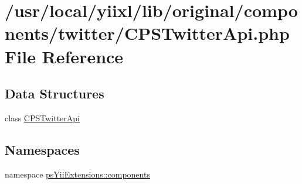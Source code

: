 \hypertarget{CPSTwitterApi_8php}{
\section{/usr/local/yiixl/lib/original/components/twitter/CPSTwitterApi.php File Reference}
\label{CPSTwitterApi_8php}
}
\subsection*{Data Structures}
\begin{DoxyCompactItemize}
\item 
class \hyperlink{classCPSTwitterApi}{CPSTwitterApi}
\end{DoxyCompactItemize}
\subsection*{Namespaces}
\begin{DoxyCompactItemize}
\item 
namespace \hyperlink{namespacepsYiiExtensions_1_1components}{psYiiExtensions::components}
\end{DoxyCompactItemize}
